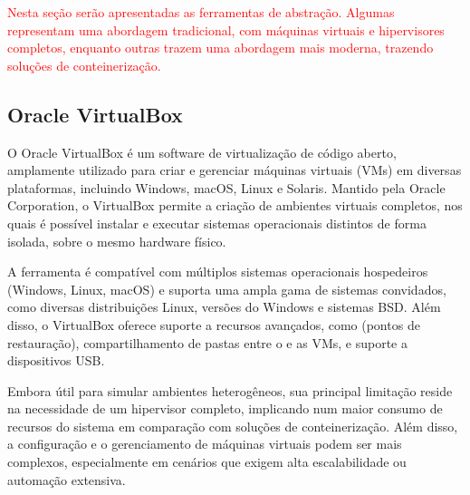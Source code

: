 

\textcolor{red}{
    Nesta seção serão apresentadas as ferramentas de abstração. Algumas representam uma abordagem tradicional, com máquinas virtuais e hipervisores completos, enquanto outras trazem uma abordagem mais moderna, trazendo soluções de conteinerização.
}


\subsection{Oracle VirtualBox}
\label{subsection:VirtualBox}

O Oracle VirtualBox \citep{virtualbox2025} é um software de virtualização de código aberto, amplamente utilizado para criar e gerenciar máquinas virtuais (VMs) em diversas plataformas, incluindo Windows, macOS, Linux e Solaris. Mantido pela Oracle Corporation, o VirtualBox permite a criação de ambientes virtuais completos, nos quais é possível instalar e executar sistemas operacionais distintos de forma isolada, sobre o mesmo hardware físico.

A ferramenta é compatível com múltiplos sistemas operacionais hospedeiros (Windows, Linux, macOS) e suporta uma ampla gama de sistemas convidados, como diversas distribuições Linux, versões do Windows e sistemas BSD. Além disso, o VirtualBox oferece suporte a recursos avançados, como  (pontos de restauração), compartilhamento de pastas entre o  e as VMs, e suporte a dispositivos USB.

Embora útil para simular ambientes heterogêneos, sua principal limitação reside na necessidade de um hipervisor completo, implicando num maior consumo de recursos do sistema em comparação com soluções de conteinerização. Além disso, a configuração e o gerenciamento de máquinas virtuais podem ser mais complexos, especialmente em cenários que exigem alta escalabilidade ou automação extensiva.

